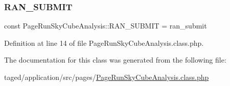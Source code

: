 \mbox{\label{class_page_run_sky_cube_analysis_a20dc3c861627ce5464ddf0170ff45af1}} 
\subsubsection{\texorpdfstring{R\+A\+N\+\_\+\+S\+U\+B\+M\+IT}{RAN\_SUBMIT}}
{\footnotesize\ttfamily const Page\+Run\+Sky\+Cube\+Analysis\+::\+R\+A\+N\+\_\+\+S\+U\+B\+M\+IT = \textquotesingle{}ran\+\_\+submit\textquotesingle{}}



Definition at line 14 of file Page\+Run\+Sky\+Cube\+Analysis.\+class.\+php.



The documentation for this class was generated from the following file\+:\begin{DoxyCompactItemize}
\item 
taged/application/src/pages/\hyperlink{_page_run_sky_cube_analysis_8class_8php}{Page\+Run\+Sky\+Cube\+Analysis.\+class.\+php}\end{DoxyCompactItemize}
